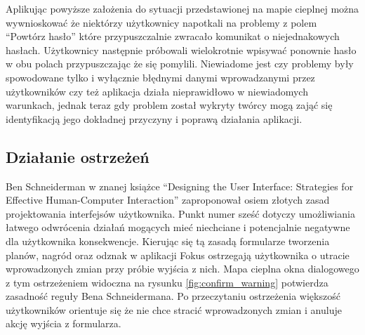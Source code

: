 Aplikując powyższe założenia do sytuacji przedstawionej na mapie cieplnej można wywnioskować że niektórzy użytkownicy napotkali na problemy z polem ``Powtórz hasło'' które przypuszczalnie zwracało komunikat o niejednakowych hasłach. Użytkownicy następnie próbowali wielokrotnie wpisywać ponownie hasło w obu polach przypuszczając że się pomylili. Niewiadome jest czy problemy były spowodowane tylko i wyłącznie błędnymi danymi wprowadzanymi przez użytkowników czy też aplikacja działa nieprawidłowo w niewiadomych warunkach, jednak teraz gdy problem został wykryty twórcy mogą zająć się identyfikacją jego dokładnej przyczyny i poprawą działania aplikacji.

\bigskip
{}

\subsection{Działanie ostrzeżeń}
Ben Schneiderman w znanej książce ``Designing the User Interface: Strategies for Effective Human-Computer Interaction'' \cite{Designing_IU} zaproponował osiem złotych zasad projektowania interfejsów użytkownika. Punkt numer sześć dotyczy umożliwiania łatwego odwrócenia działań mogących mieć niechciane i potencjalnie negatywne dla użytkownika konsekwencje. Kierując się tą zasadą formularze tworzenia planów, nagród oraz odznak w aplikacji Fokus ostrzegają użytkownika o utracie wprowadzonych zmian przy próbie wyjścia z nich. Mapa cieplna okna dialogowego z tym ostrzeżeniem widoczna na rysunku \ref{fig:confirm_warning} potwierdza zasadność reguły Bena Schneidermana. Po przeczytaniu ostrzeżenia większość użytkowników orientuje się że nie chce stracić wprowadzonych zmian i anuluje akcję wyjścia z formularza.

\bigskip
{}
